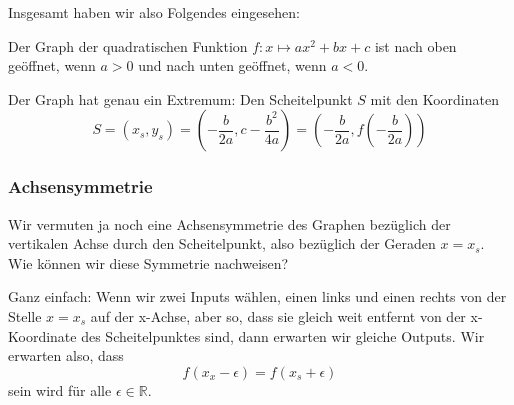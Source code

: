 Insgesamt haben wir also Folgendes eingesehen:
\medskip

\begin{theo}{}
    Der Graph der quadratischen Funktion $f:x \mapsto ax^2+bx+c$ ist nach oben geöffnet, wenn $a>0$ und nach unten geöffnet, wenn $a<0$.

    Der Graph hat genau ein Extremum: Den Scheitelpunkt $S$ mit den Koordinaten
    \[
        S=(x_s,y_s )=\left(-\frac{b}{2a},c-\frac{b^2}{4a}\right)=\left(-\frac{b}{2a},f\left(-\frac{b}{2a}\right)\right)
    \]
\end{theo}
\subsubsection{Achsensymmetrie}
Wir vermuten ja noch eine Achsensymmetrie des Graphen bezüglich der vertikalen Achse durch den Scheitelpunkt, also bezüglich der Geraden $x=x_s$. Wie können wir diese Symmetrie nachweisen?

Ganz einfach: Wenn wir zwei Inputs wählen, einen links und einen rechts von der Stelle $x=x_s$ auf der x-Achse, aber so, dass sie gleich weit entfernt von der x-Koordinate des Scheitelpunktes sind, dann erwarten wir gleiche Outputs. Wir erwarten also, dass
\[
    f(x_x-\epsilon) = f(x_s+\epsilon)
\]
sein wird für alle $\epsilon \in \mathbb{R}$.

